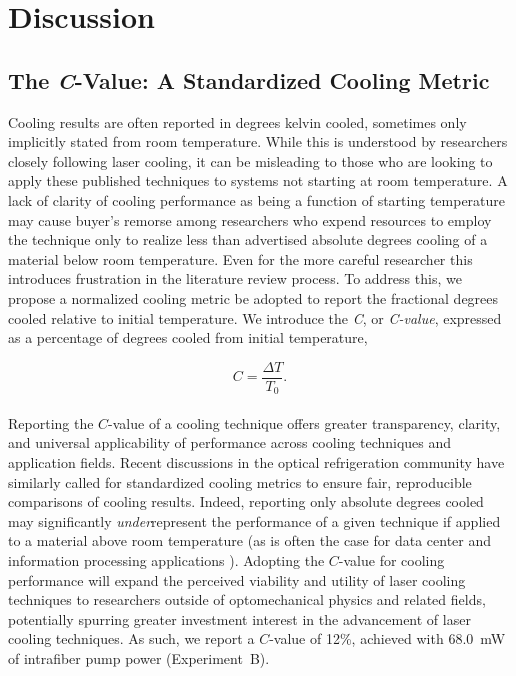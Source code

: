 
\section{Discussion}
\label{Cooling:sec:Discussion}

\subsection{The \textit{C}-Value: A Standardized Cooling Metric}
\label{Cooling:subsec:StandardizedCoolingMetric}

Cooling results are often reported in degrees kelvin cooled, sometimes only implicitly stated from room temperature. While this is understood by researchers closely following laser cooling, it can be misleading to those who are looking to apply these published techniques to systems not starting at room temperature. A lack of clarity of cooling performance as being a function of starting temperature may cause buyer's remorse among researchers who expend resources to employ the technique only to realize less than advertised absolute degrees cooling of a material below room temperature. Even for the more careful researcher this introduces frustration in the literature review process. To address this, we propose a normalized cooling metric be adopted to report the fractional degrees cooled relative to initial temperature. We introduce the \emph{\ac{C}}, or \emph{C-value}, expressed as a percentage of degrees cooled from initial temperature,

\begin{equation}
  C = \frac{\Delta T}{T_{0}}.
\end{equation}
\\
Reporting the \(C\)-value of a cooling technique offers greater transparency, clarity, and universal applicability of performance across cooling techniques and application fields. Recent discussions in the optical refrigeration community have similarly called for standardized cooling metrics to ensure fair, reproducible comparisons of cooling results. \cite{zhang2024experimental} Indeed, reporting only absolute degrees cooled may significantly \emph{under}represent the performance of a given technique if applied to a material above room temperature (as is often the case for data center and information processing applications \cite{}). Adopting the \(C\)-value for cooling performance will expand the perceived viability and utility of laser cooling techniques to researchers outside of optomechanical physics and related fields, potentially spurring greater investment interest in the advancement of laser cooling techniques. As such, we report a \(C\)-value of 12\%, achieved with \SI{68.0}{\milli\watt} of intrafiber pump power (Experiment~B).

